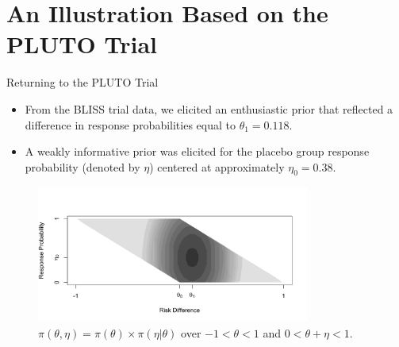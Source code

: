 \documentclass{beamer}
\begin{document}
\section{An Illustration Based on the PLUTO Trial}
\begin{frame}{Returning to the PLUTO Trial}
\begin{itemize}
	  \item From the BLISS trial data, we elicited an enthusiastic prior that reflected a 
	    	  difference in response probabilities equal to $\theta_1=0.118$.
		
		\vspace{0.2cm}	
		\item A weakly informative prior was elicited for the placebo group response probability (denoted by $\eta$) centered
		      at approximately $\eta_0=0.38$. 
\end{itemize}

\vspace{-0.3cm}
\begin{figure}[htbp]
\begin{center}
\includegraphics[width=0.8\textwidth]{./figures/enth_aug12.png}
\caption{$\pi(\theta,\eta)=\pi(\theta)\times\pi(\eta|\theta)$ over $-1<\theta<1$ and $0<\theta+\eta<1$.}
\label{fig:figure5}
 \end{center}
\end{figure}

\end{frame}
\end{document}
